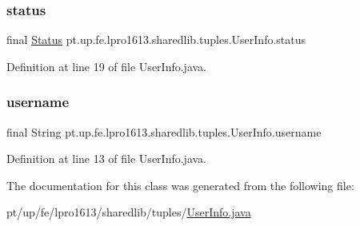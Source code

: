 \subsubsection{\texorpdfstring{status}{status}}
{\footnotesize\ttfamily final \hyperlink{enumpt_1_1up_1_1fe_1_1lpro1613_1_1sharedlib_1_1tuples_1_1_user_info_1_1_status}{Status} pt.\+up.\+fe.\+lpro1613.\+sharedlib.\+tuples.\+User\+Info.\+status}



Definition at line 19 of file User\+Info.\+java.

\hypertarget{classpt_1_1up_1_1fe_1_1lpro1613_1_1sharedlib_1_1tuples_1_1_user_info_adf5a1f573fe43fe1d9806fded73076c2}{}\label{classpt_1_1up_1_1fe_1_1lpro1613_1_1sharedlib_1_1tuples_1_1_user_info_adf5a1f573fe43fe1d9806fded73076c2} 
\subsubsection{\texorpdfstring{username}{username}}
{\footnotesize\ttfamily final String pt.\+up.\+fe.\+lpro1613.\+sharedlib.\+tuples.\+User\+Info.\+username}



Definition at line 13 of file User\+Info.\+java.



The documentation for this class was generated from the following file\+:\begin{DoxyCompactItemize}
\item 
pt/up/fe/lpro1613/sharedlib/tuples/\hyperlink{_user_info_8java}{User\+Info.\+java}\end{DoxyCompactItemize}
